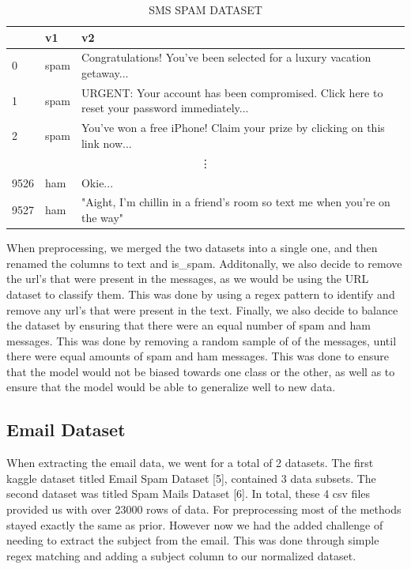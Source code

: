 \documentclass{article}
\begin{document}
\begin{table}[htbp]
    \centering
    \caption{SMS SPAM DATASET}
    \begin{tabular}{lll}
    \toprule
     & v1 & v2 \\
    \midrule
    0 & spam & Congratulations! You've been selected for a luxury vacation getaway... \\
    1 & spam & URGENT: Your account has been compromised. Click here to reset your password immediately... \\
    2 & spam & You've won a free iPhone! Claim your prize by clicking on this link now... \\
    \multicolumn{3}{c}{\vdots} \\ %
    9526 & ham & Okie... \\
    9527 & ham & "Aight, I'm chillin in a friend's room so text me when you're on the way" \\
    \bottomrule
    \end{tabular}
    \label{tab:csv_sample}
\end{table}

\noindent
When preprocessing, we merged the two datasets into a single one, and then renamed the columns to text and is\_spam. Additonally, we also decide to remove the url's that were present in the messages, as we would be using the URL dataset to classify them. This was done by using a regex pattern to identify and remove any url's that were present in the text. Finally, we also decide to balance the dataset by ensuring that there were an equal number of spam and ham messages. This was done by removing a random sample of of the messages, until there were equal amounts of spam and ham messages. This was done to ensure that the model would not be biased towards one class or the other, as well as to ensure that the model would be able to generalize well to new data.

\subsection*{Email Dataset}

When extracting the email data, we went for a total of 2 datasets. The first kaggle dataset titled Email Spam Dataset [5], contained 3 data subsets. The second dataset was titled Spam Mails Dataset [6]. In total, these 4 csv files provided us with over 23000 rows of data. 
\newline
\newline
\noindent
For preprocessing most of the methods stayed exactly the same as prior. However now we had the added challenge of needing to extract the subject from the email. This was done through simple regex matching and adding a subject column to our normalized dataset. 
\end{document}
